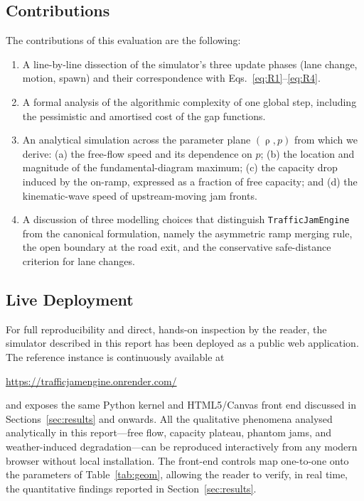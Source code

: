 \documentclass[11pt,a4paper]{article}
\DeclareMathOperator{\dens}{\rho}
\begin{document}
\subsection{Contributions}

The contributions of this evaluation are the following:
\begin{enumerate}[leftmargin=1.6em]
\item A line-by-line dissection of the simulator's three update phases
      (lane change, motion, spawn) and their correspondence with
      Eqs.~\eqref{eq:R1}--\eqref{eq:R4}.
\item A formal analysis of the algorithmic complexity of one global step,
      including the pessimistic and amortised cost of the gap functions.
\item An analytical simulation across the parameter plane $(\dens,p)$ from
      which we derive: (a) the free-flow speed and its dependence on $p$;
      (b) the location and magnitude of the fundamental-diagram maximum;
      (c) the capacity drop induced by the on-ramp, expressed as a fraction
      of free capacity; and (d) the kinematic-wave speed of upstream-moving
      jam fronts.
\item A discussion of three modelling choices that distinguish
      \texttt{TrafficJamEngine} from the canonical formulation, namely the
      asymmetric ramp merging rule, the open boundary at the road exit, and
      the conservative safe-distance criterion for lane changes.
\end{enumerate}

\subsection{Live Deployment}

For full reproducibility and direct, hands-on inspection by the reader,
the simulator described in this report has been deployed as a public web
application. The reference instance is continuously available at
\begin{center}
\url{https://trafficjamengine.onrender.com/}
\end{center}
and exposes the same Python kernel and HTML5/Canvas front end discussed
in Sections~\ref{sec:results} and onwards. All the qualitative phenomena
analysed analytically in this report---free flow, capacity plateau,
phantom jams, and weather-induced degradation---can be reproduced
interactively from any modern browser without local installation. The
front-end controls map one-to-one onto the parameters of
Table~\ref{tab:geom}, allowing the reader to verify, in real time, the
quantitative findings reported in Section~\ref{sec:results}.
\end{document}
